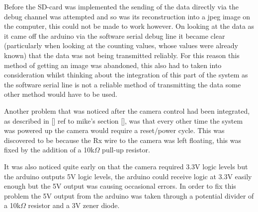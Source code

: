 Before the SD-card was implemented the sending of the data directly via the debug channel was attempted and so was its reconstruction into a jpeg image on the computer, this could not be made to work however. On looking at the data as it came off the arduino via the software serial debug line it became clear (particularly when looking at the counting values, whose values were already known) that the data was not being transmitted reliably. For this reason this method of getting an image was abandoned, this also had to taken into consideration whilst thinking about the integration of this part of the system as the software serial line is not a reliable method of transmitting the data some other method would have to be used.

Another problem that was noticed after the camera control had been integrated, as described in [] ref to mike's section [], was that every other time the system was powered up the camera would require a reset/power cycle. This was discovered to be because the Rx wire to the camera was left floating, this was fixed by the addition of a 10k$\Omega$ pull-up resistor.

It was also noticed quite early on that the camera required 3.3V logic \cite{ucam_datasheet} levels but the arduino outputs 5V logic levels, the arduino could receive logic at 3.3V easily enough but the 5V output was causing occasional errors. In order to fix this problem the 5V output from the arduino was taken through a potential divider of a 10k$\Omega$ resistor and a 3V zener diode.